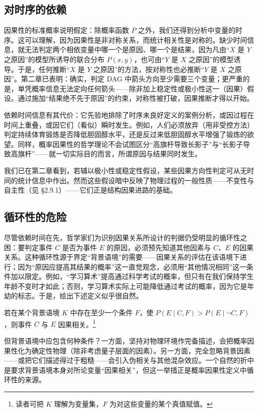 \subsection{对时序的依赖}

因果性的标准概率说明假定：除概率函数 $P$ 之外，我们还得到分析中变量的时序。这可以理解，因为因果性是非对称关系，而统计相关性是对称的。缺少时间信息，就无法判定两个相依变量中哪一个是原因、哪一个是结果，因为凡由“$X$ 是 $Y$ 之原因”的模型所诱导的联合分布 $P(x,y)$，也可由“$Y$ 是 $X$ 之原因”的模型诱导。于是，任何推断“$X$ 是 $Y$ 之原因”的方法，按对称性也必推断“$Y$ 是 $X$ 之原因”。第二章已表明：确实，判定 DAG 中箭头方向至少需要三个变量；更严重的是，单凭概率信息无法定向任何箭头——除非加上稳定性或极小性这一（因果）假设。通过施加“结果绝不先于原因”的约束，对称性被打破，因果推断才得以开始。

依赖时间信息有其代价：它先验地排除了时序未良好定义的案例分析，或因过程在时间上重叠，或因它们（看似）瞬时发生。例如，人们必须放弃（用非受控方法）判定持续体育锻炼是否降低胆固醇水平，还是反过来低胆固醇水平增强了锻炼的欲望。同样，概率因果性的哲学理论不会试图区分“高旗杆导致长影子”与“长影子导致高旗杆”——就一切实际目的而言，所谓原因与结果同时发生。

我们已在第二章看到，若辅以极小性或稳定性假设，某些因果方向性判定可从无时间的统计信息中作出。然而这些假设暗中反映了物理过程的一般性质——不变性与自主性（见 \S 2.9.1）——它们正是结构因果进路的基础。

\subsection{循环性的危险}

尽管依赖时间在先，哲学家们为识别因果关系所设计的判据仍受明显的循环性之困：要判定事件 $C$ 是否为事件 $E$ 的原因，必须预先知道其他因素与 $C$、$E$ 的因果关系。这种循环性源于界定“背景语境”的需要——因果关系的评估在该语境下进行；因为“原因应提高其结果的概率”这一直觉观念，必须用“其他情况相同”这一条件加以限定。例如，“学习算术”提高通过科学考试的概率，但只有在我们保持学生年龄不变时才如此；否则，学习算术实际上可能降低通过考试的概率，因为它是年幼的标志。于是，给出下述定义似乎很自然。

\begin{definition}
若在某个背景语境 $K$ 中存在至少一个条件 $F$，使 $P(E\mid C,F)>P(E\mid\neg C,F)$，则事件 $C$ 与 $E$ 因果相关。\footnote{读者可把 $K$ 理解为变量集，$F$ 为对这些变量的某个真值赋值。}
\end{definition}

但背景语境中应包含何种条件？一方面，坚持对物理环境作完备描述，会把概率因果性化为确定性物理（除非考虑量子层面的因素）。另一方面，完全忽略背景因素——或把它们描述得过于粗糙——会引入伪相关与其他混杂效应。一个自然的折中是要求背景语境本身对所论变量“因果相关”，但这一举措正是概率因果性定义中循环性的来源。

